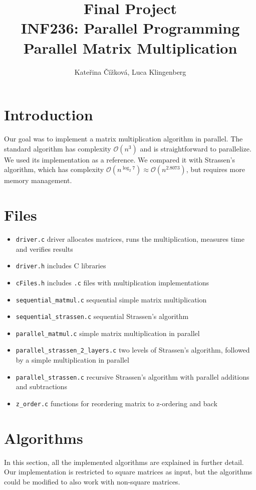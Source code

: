 \documentclass{article}
\title{Final Project\\ INF236: Parallel Programming\\ Parallel Matrix Multiplication}
\author{Kate\v{r}ina \v{C}\'{i}\v{z}kov\'{a}, Luca Klingenberg}
\begin{document}
\maketitle

\section{Introduction}
Our goal was to implement a matrix multiplication algorithm in parallel.
The standard algorithm has complexity $\mathcal{O}(n^3)$ and is straightforward
to parallelize. We used its implementation as a reference. We compared
it with Strassen's algorithm, which has complexity $\mathcal{O}(n^{\log_2{7}}) \approx \mathcal{O}(n^{2.8073})$,
but requires more memory management.

\section{Files}
\begin{itemize}
    \item \texttt{driver.c} driver allocates matrices, runs the multiplication,
    measures time and verifies results
    \item \texttt{driver.h} includes C libraries
    \item \texttt{cFiles.h} includes \texttt{.c} files with multiplication implementations

    \item \texttt{sequential\_matmul.c} sequential simple matrix multiplication
    \item \texttt{sequential\_strassen.c} sequential Strassen's algorithm
    \item \texttt{parallel\_matmul.c} simple matrix multiplication in parallel
    \item \texttt{parallel\_strassen\_2\_layers.c} two levels of Strassen's algorithm,
    followed by a simple multiplication in parallel
    \item \texttt{parallel\_strassen.c} recursive Strassen's algorithm with parallel
    additions and subtractions
    \item \texttt{z\_order.c} functions for reordering matrix to z-ordering and back
\end{itemize}

\section{Algorithms}
In this section, all the implemented algorithms are explained in further detail. Our implementation is restricted to square matrices as input, but the algorithms could be modified to also work with non-square matrices.
\end{document}
